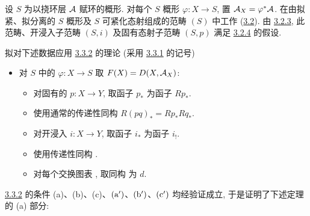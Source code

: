 \setcounter{subsubsection}{6}
\subsubsection{}
设 $S$ 为以挠环层 ${\mathcal A}$ 赋环的概形. 对每个 $S$ 概形 $\varphi:X\rightarrow S$, 置 ${\mathcal A}_X=\varphi^{\ast}{\mathcal A}$. 在由拟紧、拟分离的 $S$ 概形及 $S$ 可紧化态射组成的范畴 $(S)$ 中工作 (\hyperref[XVII.subsec3.2]{3.2}). 由 \hyperref[XVII.prop3.2.3]{3.2.3}, 此范畴、开浸入子范畴 $(S,i)$ 及固有态射子范畴 $(S,p)$ 满足 \hyperref[XVII.subsubsec3.2.4]{3.2.4} 的假设.

拟对下述数据\pageoriginale 应用 \hyperref[XVII.prop3.3.2]{3.3.2} 的理论 (采用 \hyperref[XVII.subsubsec3.3.1]{3.3.1} 的记号)

\begin{itemize}
\item[$\alpha$)] 对 $S$ 中的 $\varphi:X\rightarrow
S$ 取 $F(X)=D(X,{\mathcal A}_X)$:
\begin{itemize}
\item[(i)] 对固有的 $p:X\rightarrow Y$, 取函子 $p_{\ast}$ 为函子 $Rp_{\ast}$.

\item[(ii)] 使用通常的传递性同构 $R(pq)_{\ast}=Rp_{\ast}Rq_{\ast}$.

\item[${\rm(i')}$] 对开浸入 $i:X\rightarrow Y$, 取函子 $i_{\ast}$ 为函子 $i_{!}$.

\item[${\rm(ii')}$] 使用传递性同构 .

\item[${\rm(iii)}$] 对每个交换图表 , 取同构  为 $d$.
\end{itemize}
\end{itemize}

\hyperref[XVII.prop3.3.2]{3.3.2} 的条件 (a)、(b)、(c)、${\rm(a')}$、${\rm(b')}$、${\rm(c')}$ 均经验证成立, 于是证明了下述定理的 (a) 部分:

